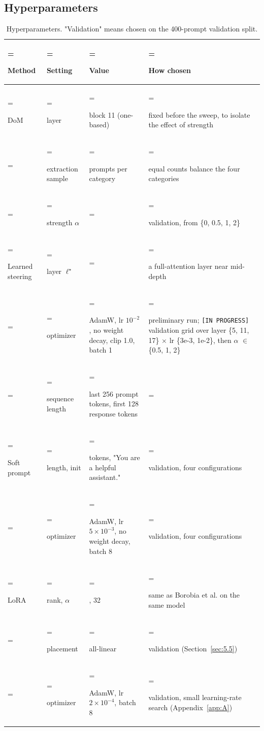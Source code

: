 \documentclass{article}
\begin{document}
\subsection{Hyperparameters}\label{sec:4.5}

\begin{table}[!htbp]
\centering
\caption{Hyperparameters. "Validation" means chosen on the 400-prompt validation split.}\label{tab:4}
\small
\setlength{\tabcolsep}{4pt}
\renewcommand{\arraystretch}{1.12}
\begin{tabularx}{\linewidth}{@{}>{\hsize=0.62\hsize\linewidth=\hsize\raggedright\arraybackslash}X>{\hsize=0.66\hsize\linewidth=\hsize\raggedright\arraybackslash}X>{\hsize=1.12\hsize\linewidth=\hsize\raggedright\arraybackslash}X>{\hsize=1.6\hsize\linewidth=\hsize\raggedright\arraybackslash}X@{}}
\toprule
\textbf{Method} & \textbf{Setting} & \textbf{Value} & \textbf{How chosen} \\
\midrule
DoM & layer & block 11 (one-based) & fixed before the sweep, to isolate the effect of strength \\
 & extraction sample & 14 prompts per category & equal counts balance the four categories \\
 & strength $\alpha$ & 1.0 & validation, from \{0, 0.5, 1, 2\} \\
Learned steering & layer $\ell^\star$ & 11 & a full-attention layer near mid-depth \\
 & optimizer & AdamW, lr $10^{-2}$, no weight decay, clip 1.0, batch 1 & preliminary run; \texttt{[IN PROGRESS]} validation grid over layer \{5, 11, 17\} \(\times\) lr \{3e-3, 1e-2\}, then $\alpha$ \(\in\) \{0.5, 1, 2\} \\
 & sequence length & last 256 prompt tokens, first 128 response tokens &  \\
Soft prompt & length, init & 20 tokens, "You are a helpful assistant." & validation, four configurations \\
 & optimizer & AdamW, lr $5\times10^{-3}$, no weight decay, batch 8 & validation, four configurations \\
LoRA & rank, $\alpha$ & 16, 32 & same as Borobia et al. \cite{ref22} on the same model \\
 & placement & all-linear & validation (Section~\ref{sec:5.5}) \\
 & optimizer & AdamW, lr $2\times10^{-4}$, batch 8 & validation, small learning-rate search (Appendix~\ref{app:A}) \\
\bottomrule
\end{tabularx}
\end{table}
\end{document}
